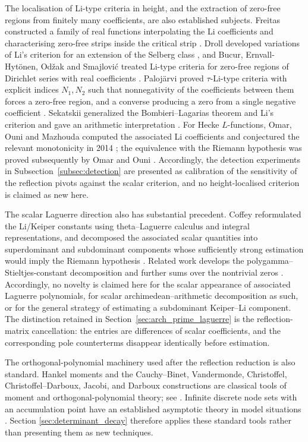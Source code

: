 \documentclass[11pt]{amsart}
\numberwithin{equation}{section}
\theoremstyle{plain}
\theoremstyle{definition}
\theoremstyle{remark}
\begin{document}
The localisation of Li-type criteria in height, and the extraction of zero-free regions
from finitely many coefficients, are also established subjects.  Freitas constructed a
family of real functions interpolating the Li coefficients and characterising zero-free
strips inside the critical strip \cite{Freitas2006}.  Droll developed variations of Li's
criterion for an extension of the Selberg class \cite{Droll2012}, and Bucur,
Ernvall-Hyt\"onen, Od\v{z}ak and Smajlovi\'c treated Li-type criteria for zero-free
regions of Dirichlet series with real coefficients \cite{BucurErnvallOdzakSmajlovic2016}.
Palojärvi proved $\tau$-Li-type criteria with explicit indices $N_1,N_2$ such that
nonnegativity of the coefficients between them forces a zero-free region, and a converse
producing a zero from a single negative coefficient \cite{Palojarvi2018}.  Sekatskii
generalized the Bombieri--Lagarias theorem and Li's criterion and gave an arithmetic
interpretation \cite{Sekatskii2014}.  For Hecke $L$-functions, Omar, Ouni and Mazhouda
computed the associated Li coefficients and conjectured the relevant monotonicity in 2014
\cite{OmarOuniMazhouda2014}; the equivalence with the Riemann hypothesis was proved
subsequently by Omar and Ouni \cite{OmarOuni2017}.  Accordingly, the detection
experiments in Subsection~\ref{subsec:detection} are presented as calibration of the
sensitivity of the reflection pivots against the scalar criterion, and no height-localised
criterion is claimed as new here.

The scalar Laguerre direction also has substantial precedent.  Coffey reformulated the Li/Keiper constants using theta--Laguerre calculus and integral representations, and decomposed the associated scalar quantities into superdominant and subdominant components whose sufficiently strong estimation would imply the Riemann hypothesis \cite{Coffey2007ThetaLaguerre}.  Related work develops the polygamma--Stieltjes-constant decomposition and further sums over the nontrivial zeros \cite{Coffey2010Polygamma,Coffey2010ZeroSums}.  Accordingly, no novelty is claimed here for the scalar appearance of associated Laguerre polynomials, for scalar archimedean--arithmetic decomposition as such, or for the general strategy of estimating a subdominant Keiper--Li component.  The distinction retained in Section~\ref{sec:arch_prime_laguerre} is the reflection-matrix cancellation: the entries are differences of scalar coefficients, and the corresponding pole counterterms disappear identically before estimation.

The orthogonal-polynomial machinery used after the reflection reduction is also standard. Hankel moments and the Cauchy--Binet, Vandermonde, Christoffel, Christoffel--Darboux, Jacobi, and Darboux constructions are classical tools of moment and orthogonal-polynomial theory; see \cite{Chihara1978,StahlTotik1992}. Infinite discrete node sets with an accumulation point have an established asymptotic theory in model situations \cite{WuLinXuZhao2016}. Section \ref{sec:determinant_decay} therefore applies these standard tools rather than presenting them as new techniques.
\end{document}

